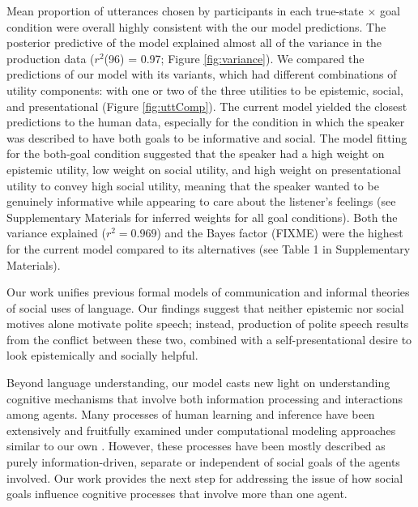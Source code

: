 \documentclass[12pt]{article}
\newcommand{\ejy}[1]{\textcolor{Red}{[ejy: #1]}}
\begin{document}
Mean proportion of utterances chosen by participants in each true-state \(\times\) goal condition were 
overall highly consistent with the our model predictions. 
The posterior predictive of the model explained almost all of the variance in the production data 
(\(r^2\)(96) = 0.97; Figure \ref{fig:variance}). 
We compared the predictions of our model with its variants, which had different combinations of utility components: 
with one or two of the three utilities to be epistemic, social, and presentational (Figure \ref{fig:uttComp}). 
The current model yielded the closest predictions to the human data, especially for the condition in which the speaker was described to have both goals to be informative and social.
The model fitting for the both-goal condition suggested that 
the speaker had a high weight on epistemic utility, low weight on social utility, 
and high weight on presentational utility to convey high social utility, 
meaning that the speaker wanted to be genuinely informative while appearing to care about the listener's feelings
(see Supplementary Materials for inferred weights for all goal conditions). 
Both the variance explained ($r^2 = 0.969$) and the Bayes factor (FIXME) were the highest 
for the current model compared to its alternatives (see Table 1 in Supplementary Materials).



Our work unifies previous formal models of communication and informal
theories of social uses of language. Our findings suggest that neither
epistemic nor social motives alone motivate polite speech; instead,
production of polite speech results from the conflict between these two,
combined with a self-presentational desire to look epistemically
and socially helpful. 

Beyond language understanding, our model casts new light on understanding cognitive mechanisms 
that involve both information processing and interactions among agents. 
Many processes of human learning and inference
have been extensively and fruitfully examined under computational modeling approaches similar to our own
\cite{tenenbaum2011, xu2007, bonawitz2011, baker2009}. 
However, these processes have been mostly described as purely information-driven, 
separate or independent of social goals of the agents involved.
Our work provides the next step for addressing the issue of 
how social goals influence cognitive processes that involve more than one agent. 
\end{document}
